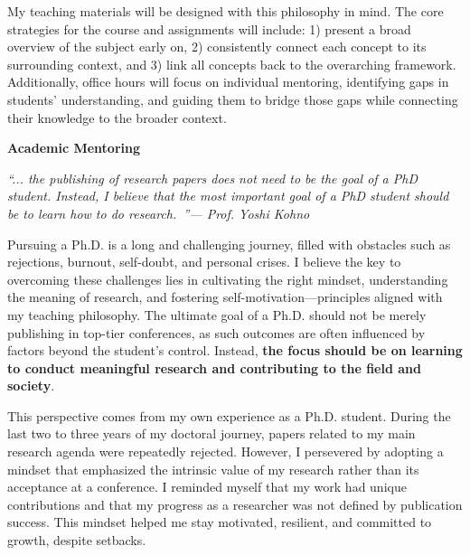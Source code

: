 \documentclass{article}
\begin{document}
My teaching materials will be designed with this philosophy in mind. The core strategies for the course and assignments will include: 1) present a broad overview of the subject early on, 2) consistently connect each concept to its surrounding context, and 3) link all concepts back to the overarching framework. Additionally, office hours will focus on individual mentoring, identifying gaps in students' understanding, and guiding them to bridge those gaps while connecting their knowledge to the broader context.

\newpage
\noindent\textbf{Academic Mentoring}\vspace{.5em}

\noindent \emph{``... the publishing of research papers does not need to be the goal of a PhD student. Instead, I believe that the most important goal of a PhD student should be to learn how to do research.~\cite{Kohno}''\hfill--- Prof. Yoshi Kohno}

\vspace{.5em}

\noindent Pursuing a Ph.D. is a long and challenging journey, filled with obstacles such as rejections, burnout, self-doubt, and personal crises. I believe the key to overcoming these challenges lies in cultivating the right mindset, understanding the meaning of research, and fostering self-motivation—principles aligned with my teaching philosophy. The ultimate goal of a Ph.D. should not be merely publishing in top-tier conferences, as such outcomes are often influenced by factors beyond the student's control. Instead, \textbf{the focus should be on learning to conduct meaningful research and contributing to the field and society}.

This perspective comes from my own experience as a Ph.D. student. During the last two to three years of my doctoral journey, papers related to my main research agenda were repeatedly rejected. However, I persevered by adopting a mindset that emphasized the intrinsic value of my research rather than its acceptance at a conference. I reminded myself that my work had unique contributions and that my progress as a researcher was not defined by publication success. This mindset helped me stay motivated, resilient, and committed to growth, despite setbacks.
\end{document}
